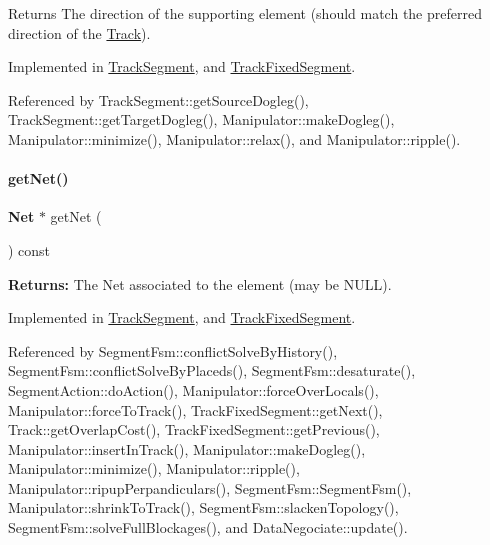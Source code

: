\begin{DoxyReturn}{Returns}
The direction of the supporting element (should match the preferred direction of the \hyperlink{classKite_1_1Track}{Track}). 
\end{DoxyReturn}


Implemented in \hyperlink{classKite_1_1TrackSegment_a0dd7cf705ace42c662c289955313b2e9}{Track\+Segment}, and \hyperlink{classKite_1_1TrackFixedSegment_a0dd7cf705ace42c662c289955313b2e9}{Track\+Fixed\+Segment}.



Referenced by Track\+Segment\+::get\+Source\+Dogleg(), Track\+Segment\+::get\+Target\+Dogleg(), Manipulator\+::make\+Dogleg(), Manipulator\+::minimize(), Manipulator\+::relax(), and Manipulator\+::ripple().

\mbox{\label{classKite_1_1TrackElement_a2b383a5b6f5028911a35e446a682dabd}} 
\paragraph{\texorpdfstring{get\+Net()}{getNet()}}
{\footnotesize\ttfamily \textbf{ Net} $\ast$ get\+Net (\begin{DoxyParamCaption}{ }\end{DoxyParamCaption}) const\hspace{0.3cm}{\ttfamily [pure virtual]}}

{\bfseries Returns\+:} The Net associated to the element (may be {\ttfamily N\+U\+LL}). 

Implemented in \hyperlink{classKite_1_1TrackSegment_a692492374623a5c6096b2c4a51190359}{Track\+Segment}, and \hyperlink{classKite_1_1TrackFixedSegment_a692492374623a5c6096b2c4a51190359}{Track\+Fixed\+Segment}.



Referenced by Segment\+Fsm\+::conflict\+Solve\+By\+History(), Segment\+Fsm\+::conflict\+Solve\+By\+Placeds(), Segment\+Fsm\+::desaturate(), Segment\+Action\+::do\+Action(), Manipulator\+::force\+Over\+Locals(), Manipulator\+::force\+To\+Track(), Track\+Fixed\+Segment\+::get\+Next(), Track\+::get\+Overlap\+Cost(), Track\+Fixed\+Segment\+::get\+Previous(), Manipulator\+::insert\+In\+Track(), Manipulator\+::make\+Dogleg(), Manipulator\+::minimize(), Manipulator\+::ripple(), Manipulator\+::ripup\+Perpandiculars(), Segment\+Fsm\+::\+Segment\+Fsm(), Manipulator\+::shrink\+To\+Track(), Segment\+Fsm\+::slacken\+Topology(), Segment\+Fsm\+::solve\+Full\+Blockages(), and Data\+Negociate\+::update().

